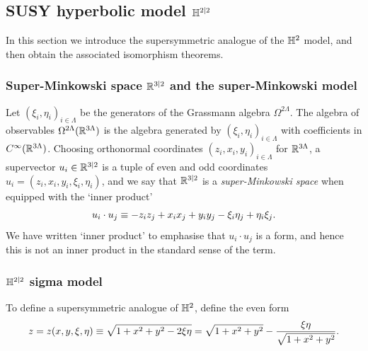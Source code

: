 \documentclass[11pt,a4paper]{article}
\begin{document}
\subsection{SUSY hyperbolic model $\mathbb{H}^{2|2}$}
\label{sec:susy-hyperb-model}

In this section we introduce the supersymmetric analogue of
the $\mathbb{H}^{2}$ model, and then obtain the 
associated isomorphism theorems.

\subsubsection{Super-Minkowski space $\mathbb{R}^{3|2}$ and the super-Minkowski model}
\label{sec:super-min}

Let $(\xi_{i},\eta_{i})_{i\in\Lambda}$ be the generators of the
Grassmann algebra $\Omega^{2\Lambda}$. The algebra of observables
$\Omega^{2\Lambda}(\mathbb{R}^{3\Lambda})$ is 
the algebra generated by $(\xi_{i},\eta_{i})_{i\in\Lambda}$ with
coefficients in $C^{\infty}(\mathbb{R}^{3\Lambda})$. Choosing orthonormal
coordinates $(z_i,x_i,y_i)_{i \in \Lambda}$ for $\mathbb{R}^{3\Lambda}$, a
supervector $u_i \in \mathbb{R}^{3|2}$ is a tuple of even and odd coordinates
$u_i = (z_i,x_i,y_i, \xi_i,\eta_i)$, and we say that $\mathbb{R}^{3|2}$ is a
\emph{super-Minkowski space} when equipped with the `inner product'
\begin{equation} 
  \label{eq:hypprod}
  u_i\cdot u_j \equiv -z_iz_j + x_ix_j + y_iy_j - \xi_i\eta_j + \eta_i\xi_j.
\end{equation}
We have written `inner product' to emphasise that $u_{i}\cdot
u_{j}$ is a form, and hence this is not an
inner product in the standard sense of the term.

\subsubsection{$\mathbb{H}^{2|2}$ sigma model}
\label{sec:H22int}

To define a supersymmetric analogue of $\mathbb{H}^{2}$, define the even form
\begin{equation}
  \label{eq:zform}
  z = z(x,y,\xi,\eta) \equiv \sqrt{1+x^{2}+y^{2} - 2\xi\eta} 
  = {\sqrt{1+x^{2}+y^{2}}}
  - \frac{\xi\eta}{\sqrt{1+x^{2}+y^{2}}}.
\end{equation}
\end{document}
